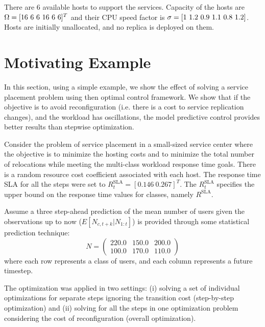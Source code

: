 There are 6 available hosts to support the services. Capacity of the hosts are  $\capp=[16\ 6\ 6\ 16\ 6\ 6]^T$ and their CPU speed factor is $\sigma=[1\ 1.2\ 0.9\ 1.1\ 0.8\ 1.2]$. 
Hosts are initially unallocated, and no replica is deployed on them. %

\section{Motivating Example}    
\label{sec:motivating-examples}   

 In this section, using a simple example, we show the effect of solving a service placement problem using then optimal control framework. We show that if the objective is to avoid reconfiguration (i.e. there is a cost to service replication changes), and the workload has oscillations, the model predictive control provides better results than stepwise optimization. 

Consider the problem of service placement in a small-sized service center where the objective is to minimize the hosting costs and to minimize the total number of relocations while meeting the multi-class workload response time goals. 
There is a random resource cost coefficient associated with each host. The response time SLA for all the steps were set to $R^\text{SLA}_t = [0.146 \  0.267]^T$. The $R^\text{SLA}_t$ specifies the upper bound on the response time values for classes, namely $R^\text{SLA}$.

Assume a three step-ahead prediction of the mean number of users given the observations up to now ($E[N_{c,t+k}|N_{1:t}]$) is provided through some statistical prediction technique: %
\[
N=\left(\begin{array}{ccc} 
220.0 & 150.0 & 200.0\\ 
100.0 & 170.0 & 110.0 \end{array}\right)
\]
 where each row represents a class of users, and each column represents a future timestep. 

 The optimization was applied in two settings: (i) solving a set of individual optimizations for separate steps ignoring the transition cost (step-by-step optimization) and (ii) solving for all the steps in one optimization problem considering the cost of reconfiguration (overall optimization).            

